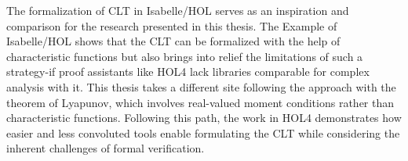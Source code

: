 The formalization of CLT in Isabelle/HOL serves as an inspiration and comparison for the research presented in this thesis. The Example of Isabelle/HOL shows that the CLT can be formalized with the help of characteristic functions but also brings into relief the limitations of such a strategy-if proof assistants like HOL4 lack libraries comparable for complex analysis with it. This thesis takes a different site following the approach with the theorem of Lyapunov, which involves real-valued moment conditions rather than characteristic functions. Following this path, the work in HOL4 demonstrates how easier and less convoluted tools enable formulating the CLT while considering the inherent challenges of formal verification.

